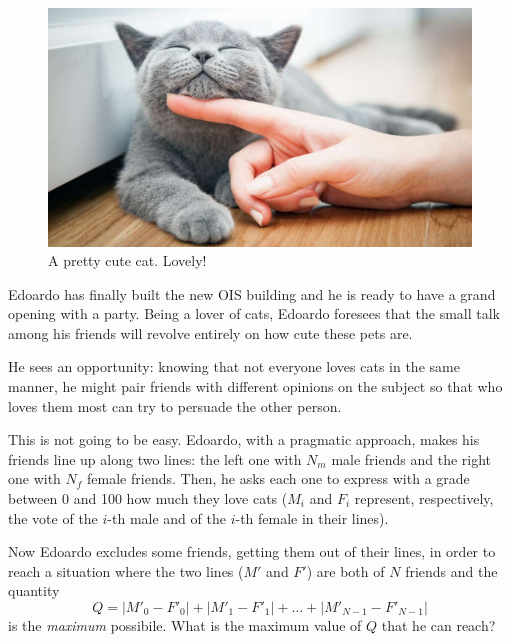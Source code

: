 \usepackage{xcolor}
\usepackage{afterpage}
\usepackage{pifont,mdframed}
\usepackage[bottom]{footmisc}

\makeatletter
\gdef\this@inputfilename{input}
\gdef\this@outputfilename{output}
\makeatother

\begin{figure}
  \vspace{-25pt}
  \begin{center}
        \includegraphics[width=0.9\linewidth]{cats.jpg}
  \end{center}
  \vspace{-20pt}
  \caption{A pretty cute cat. Lovely!}
\end{figure}

Edoardo has finally built the new OIS building and he is ready to have a grand opening with a party. Being a lover of cats, Edoardo foresees that the small talk among his friends will revolve entirely on how cute these pets are.

He sees an opportunity: knowing that not everyone loves cats in the same manner, he might pair friends with different opinions on the subject so that who loves them most can try to persuade the other person.

This is not going to be easy. Edoardo, with a pragmatic approach, makes his friends line up along two lines: the left one with $N_m$ male friends and the right one with $N_f$ female friends. Then, he asks each one to express with a grade between 0 and 100 how much they love cats ($M_i$ and $F_i$ represent, respectively, the vote of the $i$-th male and of the $i$-th female in their lines).

Now Edoardo excludes some friends, getting them out of their lines, in order to reach a situation where the two lines ($M'$ and $F'$) are both of $N$ friends and the quantity
$$Q = |M'_0 - F'_0| + |M'_1 - F'_1| + \ldots + |M'_{N-1} - F'_{N-1}|$$
is the \emph{maximum} possibile. What is the maximum value of $Q$ that he can reach?

